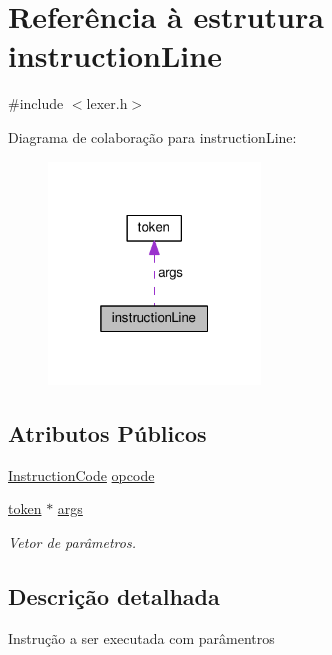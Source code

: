 \hypertarget{structinstruction_line}{\section{Referência à estrutura instruction\-Line}
\label{structinstruction_line}
}


{\ttfamily \#include $<$lexer.\-h$>$}



Diagrama de colaboração para instruction\-Line\-:
\nopagebreak
\begin{figure}[H]
\begin{center}
\leavevmode
\includegraphics[width=160pt]{structinstruction_line__coll__graph}
\end{center}
\end{figure}
\subsection*{Atributos Públicos}
\begin{DoxyCompactItemize}
\item 
\hyperlink{languagedefinition_8h_a1830ff5737e4f1610e975ee2aa489206}{Instruction\-Code} \hyperlink{structinstruction_line_a309feca274873683d12f90cf0bd81780}{opcode}
\item 
\hyperlink{structtoken}{token} $\ast$ \hyperlink{structinstruction_line_ab6b4be43f89da78d09a9469f952435c7}{args}
\begin{DoxyCompactList}\small\item\em Vetor de parâmetros. \end{DoxyCompactList}\end{DoxyCompactItemize}


\subsection{Descrição detalhada}
Instrução a ser executada com parâmentros 

